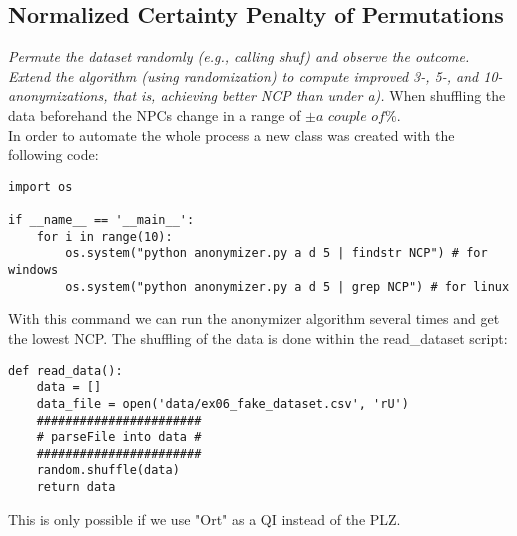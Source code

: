 \documentclass{report}
\begin{document}
		\subsection{Normalized Certainty Penalty of Permutations}
		\textit{Permute the dataset randomly (e.g., calling shuf) and observe the outcome. Extend the algorithm (using randomization) to compute improved 3-, 5-, and 10-anonymizations, that is, achieving better NCP than under a).}
		\startsubsection
			When shuffling the data beforehand the NPCs change in a range of $\pm \textit{a couple of} \%$. \\
			In order to automate the whole process a new class was created with the following code:
			\begin{verbatim}
import os

if __name__ == '__main__':
    for i in range(10):
        os.system("python anonymizer.py a d 5 | findstr NCP") # for windows
        os.system("python anonymizer.py a d 5 | grep NCP") # for linux
			\end{verbatim}
			With this command we can run the anonymizer algorithm several times and get the lowest NCP. The shuffling of the data is done within the read\_dataset script:
			\begin{verbatim}
def read_data():
	data = []
	data_file = open('data/ex06_fake_dataset.csv', 'rU')
	#######################
	# parseFile into data #
	#######################
	random.shuffle(data)
	return data
			\end{verbatim}
			This is only possible if we use "Ort" as a QI instead of the PLZ.
		\closesection
	\closesection
\end{document}
